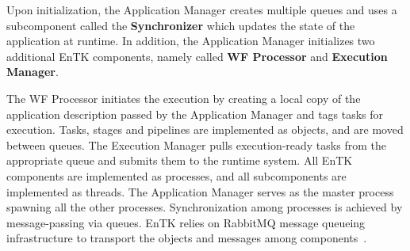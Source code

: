 


Upon initialization, the Application Manager creates multiple queues and 
uses a subcomponent called the \textbf{Synchronizer} which updates the state 
of the application at runtime. In addition, the Application Manager initializes 
two additional EnTK components, namely called \textbf{WF Processor} and 
\textbf{Execution Manager}. 

The WF Processor initiates the execution by creating a local copy of the
application description passed by the Application Manager and tags tasks 
for execution. Tasks, stages and pipelines are implemented as objects, and
are moved between queues. The Execution Manager pulls execution-ready tasks
from the appropriate queue and submits them to the runtime system. All EnTK 
components are implemented as processes, and all subcomponents are implemented 
as threads. The Application Manager serves as the master process spawning all 
the other processes. Synchronization among processes is achieved by message-passing via 
queues. EnTK relies on RabbitMQ message queueing infrastructure to transport the 
objects and messages among components~\cite{balasubramanian2017powerofmany}. 


